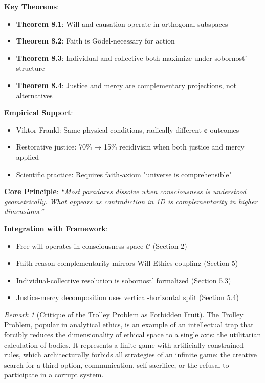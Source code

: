 \documentclass[11pt,a4paper]{article}
\theoremstyle{definition}
\theoremstyle{remark}
\newtheorem{remark}{Remark}[section]
\newcommand{\CC}{\mathcal{C}}
\newcommand{\cc}{\mathbf{c}}
\begin{document}
\begin{small}
\begin{enumerate}
\begin{mdframed}[backgroundcolor=green!10,linewidth=2pt,linecolor=green!70!black]
\textbf{Key Theorems}:
\begin{itemize}[nosep]
    \item \textbf{Theorem 8.1}: Will and causation operate in orthogonal subspaces
    \item \textbf{Theorem 8.2}: Faith is Gödel-necessary for action
    \item \textbf{Theorem 8.3}: Individual and collective both maximize under sobornost' structure
    \item \textbf{Theorem 8.4}: Justice and mercy are complementary projections, not alternatives
\end{itemize}

\textbf{Empirical Support}:
\begin{itemize}[nosep]
    \item Viktor Frankl: Same physical conditions, radically different \(\cc\) outcomes
    \item Restorative justice: 70\% → 15\% recidivism when both justice and mercy applied
    \item Scientific practice: Requires faith-axiom "universe is comprehensible"
\end{itemize}

\textbf{Core Principle}: \textit{``Most paradoxes dissolve when consciousness is understood geometrically. What appears as contradiction in 1D is complementarity in higher dimensions.''}

\textbf{Integration with Framework}:
\begin{itemize}[nosep]
    \item Free will operates in consciousness-space \(\CC\) (Section 2)
    \item Faith-reason complementarity mirrors Will-Ethics coupling (Section 5)
    \item Individual-collective resolution is sobornost' formalized (Section 5.3)
    \item Justice-mercy decomposition uses vertical-horizontal split (Section 5.4)
\end{itemize}

\begin{remark}[Critique of the Trolley Problem as Forbidden Fruit]
The Trolley Problem, popular in analytical ethics, is an example of an intellectual trap that forcibly reduces the dimensionality of ethical space to a single axis: the utilitarian calculation of bodies. It represents a finite game with artificially constrained rules, which architecturally forbids all strategies of an infinite game: the creative search for a third option, communication, self-sacrifice, or the refusal to participate in a corrupt system.


\end{remark}
\end{mdframed}
\end{enumerate}
\end{small}
\end{document}
